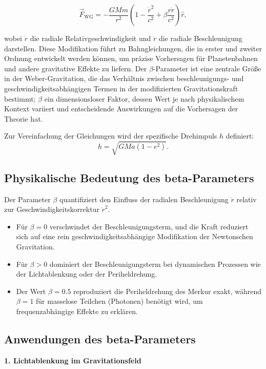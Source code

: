 \begin{equation}
\vec{F}_{\text{WG}} = -\frac{GMm}{r^2} \left(1 - \frac{\dot{r}^2}{c^2} + \beta \frac{r\ddot{r}}{c^2}\right) \hat{r},
\end{equation}

wobei $\dot{r}$ die radiale Relativgeschwindigkeit und $\ddot{r}$ die radiale Beschleunigung darstellen. Diese Modifikation führt zu Bahngleichungen, die in
erster und zweiter Ordnung entwickelt werden können, um präzise Vorhersagen für Planetenbahnen und andere gravitative Effekte zu liefern. Der $\beta$-Parameter ist
eine zentrale Größe in der Weber-Gravitation, die das Verhältnis zwischen beschleunigungs- und geschwindigkeitsabhängigen Termen in der modifizierten
Gravitationskraft bestimmt; $\beta$ ein dimensionsloser Faktor, dessen Wert je nach physikalischem Kontext variiert und entscheidende Auswirkungen auf die Vorhersagen
der Theorie hat.

Zur Vereinfachung der Gleichungen wird der spezifische Drehimpuls $h$ definiert:
\begin{equation}
h = \sqrt{GMa(1 - e^2)}.
\end{equation}

\subsection{Physikalische Bedeutung des beta-Parameters}
Der Parameter $\beta$ quantifiziert den Einfluss der radialen Beschleunigung $\ddot{r}$ relativ zur Geschwindigkeitskorrektur $\dot{r}^2$.
\begin{itemize}
    \item Für $\beta=0$ verschwindet der Beschleunigungsterm, und die Kraft reduziert sich auf eine rein geschwindigkeitsabhängige Modifikation der Newtonschen Gravitation.
    \item Für $\beta>0$ dominiert der Beschleunigungsterm bei dynamischen Prozessen wie der Lichtablenkung oder der Periheldrehung.
    \item Der Wert $\beta=0.5$ reproduziert die Periheldrehung des Merkur exakt, während $\beta=1$ für masselose Teilchen (Photonen) benötigt wird, um frequenzabhängige Effekte zu erklären.
\end{itemize}

\subsection{Anwendungen des beta-Parameters}
\textbf{1. Lichtablenkung im Gravitationsfeld}

